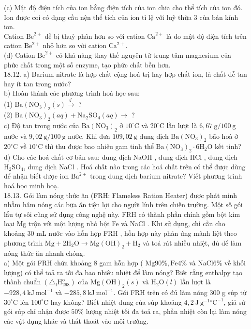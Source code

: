 \documentclass[10pt]{article}
\begin{document}
(c) Mật độ điện tích của ion bằng điện tích của ion chia cho thể tích của ion đó. Ion được coi có dạng cầu nện thể tích của ion tỉ lệ với luỹ thừa 3 của bán kính ion.\\
Cation $\mathrm{Be}^{2+}$ dễ bị thuỷ phân hơn so với cation $\mathrm{Ca}^{2+}$ là do mật độ điện tích trên cation $\mathrm{Be}^{2+}$ nhỏ hơn so với cation $\mathrm{Ca}^{2+}$.\\
(d) Cation $\mathrm{Be}^{2+}$ có khả năng thay thế nguyên tử trung tâm magnesium của phức chất trong một số enzyme, tạo phức chất bền hơn.\\
18.12. a) Barium nitrate là hợp chất cộng hoá trị hay hợp chất ion, là chất dễ tan hay ít tan trong nước?\\
b) Hoàn thành các phương trình hoá học sau:\\
(1) $\mathrm{Ba}\left(\mathrm{NO}_{3}\right)_{2}(s) \xrightarrow{\mathfrak{t}^{\circ}}$ ?\\
(2) $\mathrm{Ba}\left(\mathrm{NO}_{3}\right)_{2}(a q)+\mathrm{Na}_{2} \mathrm{SO}_{4}(a q) \rightarrow$ ?\\
c) Độ tan trong nước của $\mathrm{Ba}\left(\mathrm{NO}_{3}\right)_{2}$ ở $10^{\circ} \mathrm{C}$ và $20^{\circ} \mathrm{C}$ lần lượt là $6,67 \mathrm{~g} / 100 \mathrm{~g}$ nước và $9,02 \mathrm{~g} / 100 \mathrm{~g}$ nước. Khi đưa $109,02 \mathrm{~g}$ dung dịch $\mathrm{Ba}\left(\mathrm{NO}_{3}\right)_{2}$ bão hoà ở $20^{\circ} \mathrm{C}$ về $10^{\circ} \mathrm{C}$ thì thu được bao nhiêu gam tinh thể $\mathrm{Ba}\left(\mathrm{NO}_{3}\right)_{2} \cdot 6 \mathrm{H}_{2} \mathrm{O}$ kết tinh?\\
d) Cho các hoá chất cơ bản sau: dung dịch NaOH , dung dịch HCl , dung dịch $\mathrm{H}_{2} \mathrm{SO}_{4}$, dung dịch NaCl . Hoá chất nào trong các hoá chất trên có thể được dùng để nhận biết được ion $\mathrm{Ba}^{2+}$ trong dung dịch barium nitrate? Viết phương trình hoá học minh hoạ.\\
18.13. Gói làm nóng thức ăn (FRH: Flameless Ration Heater) được phát minh nhằm hâm nóng các bữa ăn tiện lợi cho người lính trên chiến trường. Một số gói lẩu tự sôi cũng sử dụng công nghệ này. FRH có thành phần chính gồm bột kim loại Mg trộn với một lượng nhỏ bột Fe và NaCl . Khi sử dụng, chỉ cần cho khoảng 30 mL nước vào hỗn hợp FRH , hỗn hợp này phản ứng mãnh liệt theo phương trình $\mathrm{Mg}+2 \mathrm{H}_{2} \mathrm{O} \rightarrow \mathrm{Mg}(\mathrm{OH})_{2}+\mathrm{H}_{2}$ và toả rát nhiều nhiệt, đủ để làm nóng thức ăn nhanh chóng.\\
a) Một gói FRH chứa khoảng 8 gam hỗn hợp ( $\mathrm{Mg} 90 \%, \mathrm{Fe} 4 \%$ và $\mathrm{NaCl} 6 \%$ về khối lượng) có thể toả ra tối đa bao nhiêu nhiệt để làm nóng? Biết rằng enthalpy tạo thành chuẩn $\left(\triangle_{\mathrm{f}} \mathrm{H}_{298}^{\mathrm{o}}\right)$ của $\mathrm{Mg}(\mathrm{OH})_{2}(s)$ và $\mathrm{H}_{2} \mathrm{O}(l)$ lần lượt là $-928,4 \mathrm{~kJ} \mathrm{~mol}^{-1}$ và $-285,8 \mathrm{~kJ} \mathrm{~mol}^{-1}$. Gói FRH trên có đủ làm nóng 300 g súp từ $30^{\circ} \mathrm{C}$ lên $100^{\circ} \mathrm{C}$ hay không? Biết nhiệt dung của súp khoảng $4,2 \mathrm{~J} \mathrm{~g}^{-1}{ }^{\circ} \mathrm{C}^{-1}$, giả sử gói súp chỉ nhận được $50 \%$ lượng nhiệt tối đa toả ra, phần nhiệt còn lại làm nóng các vật dụng khác và thất thoát vào môi trường.\\
\end{document}
